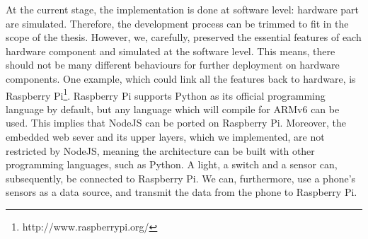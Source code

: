 At the current stage, the implementation is done at software level: hardware part are simulated. Therefore, the development process can be trimmed to fit in the scope of the thesis. However, we, carefully, preserved the essential features of each hardware component and simulated at the software level. This means, there should not be many different behaviours for further deployment on hardware components. One example, which could link all the features back to hardware, is Raspberry Pi\footnote{http://www.raspberrypi.org/}. Raspberry Pi supports Python as its official programming language by default, but any language which will compile for ARMv6 can be used. This implies that NodeJS can be ported on Raspberry Pi. Moreover, the embedded web sever and its upper layers, which we implemented, are not restricted by NodeJS, meaning the architecture can be built with other programming languages, such as Python. A light, a switch and a sensor can, subsequently, be connected to Raspberry Pi. We can, furthermore, use a phone's sensors as a data source, and transmit the data from the phone to Raspberry Pi. 